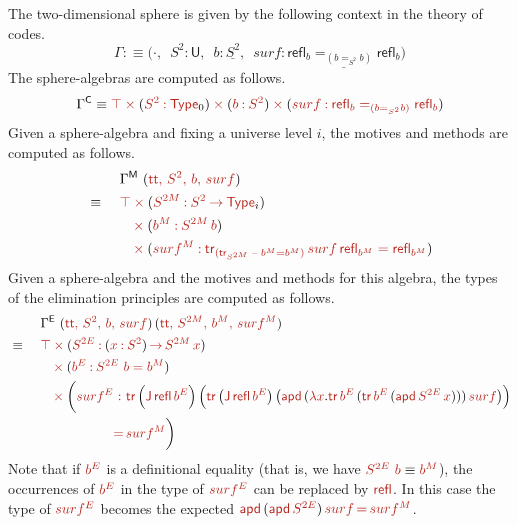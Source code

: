 \documentclass[a4paper,UKenglish]{lipics-v2018}
\newcommand{\U}{\mathsf{U}}
\newcommand{\ra}{\rightarrow}
\newcommand{\blank}{\mathord{\hspace{1pt}\text{--}\hspace{1pt}}} %
\newcommand{\C}{\mathsf{C}}
\newcommand{\M}{\mathsf{M}}
\newcommand{\refl}{\mathsf{refl}}
\newcommand{\1}{\mathsf{1}} \renewcommand{\Pr}{\mathsf{Pr}}
\renewcommand{\in}{\mathbin{\hat:}}
\renewcommand{\hat}[1]{{\color{BrickRed}{#1}}}
\newcommand{\rah}{\mathbin{\hat\ra}}
\newcommand{\timesh}{\mathbin{\hat\times}}
\newcommand{\TR}{\hat{\mathsf{tr}}}
\newcommand{\apd}{\hat{\mathsf{apd}}}
\renewcommand{\tt}{\hat{\mathsf{tt}}}
\newcommand{\Type}{\hat{\mathsf{Type}}}
\begin{document}
The two-dimensional sphere is given by the following context in the
theory of codes.
\[
\Gamma :\equiv \Big(\cdot,\,\,\,S^2:\U,\,\,\,b:\underline{S^2},\,\,\,surf:\underline{\refl_{b} =_{(b=_{S^2} b)} \refl_{b}}\Big)
\]
The sphere-algebras are computed as follows.
\begin{alignat*}{5}
  & && \Gamma^\C \equiv \hat{\top}\timesh(\hat{S^2}\in\Type_0)\timesh(\hat{b}\in \hat{S^2})\timesh(\hat{surf\in \hat{\refl_{\hat{b}}}=_{(\hat{b}=_{\hat{S^2}}\hat{b})}\hat{\refl_{\hat{b}}}})
\end{alignat*}
Given a sphere-algebra and fixing a universe level $i$, the motives
and methods are computed as follows.
\begin{alignat*}{5}
  & && \Gamma^\M\,\,(\hat{\tt,\,S^2,\,b,\,surf})\\
  & \equiv \,\, && \hat{\top}\timesh(\hat{S^{2M}}\in \hat{S^2}\rah\Type_i) \\
  & && \hspace{0.75em} \timesh(\hat{b^M}\in \hat{S^{2M}\,b}) \\
  & && \hspace{0.75em} \timesh(\hat{surf^M\in \TR_{(\TR_{S^{2M}}\,\blank\,b^M=b^M)}\,surf\,\refl_{b^M} = \refl_{b^M}})
\end{alignat*}
Given a sphere-algebra and the motives and methods for this algebra,
the types of the elimination principles are computed as follows.
\begin{alignat*}{5}
  & && \Gamma^\E\,\,(\hat{\tt,\,S^2,\,b,\,surf})\,(\hat{\tt,\,S^{2M},\,b^M,\,surf^M}) \\
  & \equiv \,\, && \hat{\top}\timesh(\hat{S^{2E}}\in (\hat{x}\in\hat{S^2})\hat{\,\ra\,}\hat{S^{2M}\,x}) \\
  & && \hspace{0.75em} \timesh(\hat{b^E}\in \hat{S^{2E}\,\,b = b^M})\\
  & && \hspace{0.75em} \timesh\bigg(\hat{surf^E\,\,\in\,\,} \TR\,\Big(\hat{\J\,\refl\,b^E}\Big)\,\Big(\TR\,\big(\hat{\J\,\refl\,b^E}\big)\,\big(\hat{\apd}\,(\hat{\lambda} \hat{x}.\TR\,\hat{b^E}\,(\TR\,\hat{b^E}\,(\hat{\apd}\,\hat{S^{2E}}\,\hat{x})))\,\hat{surf}\big)\Big) \\
  & && \hspace{5.5em} \hat{=} \,\hat{surf^M}\bigg)
\end{alignat*}
Note that if $\hat{b^E}$ is a definitional equality (that is, we have
$\hat{S^{2E}\,\,b} \equiv \hat{b^M}$), the occurrences of $\hat{b^E}$
in the type of $\hat{surf^E}$ can be replaced by $\hat{\refl}$. In
this case the type of $\hat{surf^E}$ becomes the expected
$\hat{\apd}\,(\hat{\apd}\,\hat{S^{2E}})\,\hat{surf}\,\hat{=}\,\hat{surf^M}$.



\end{document}
